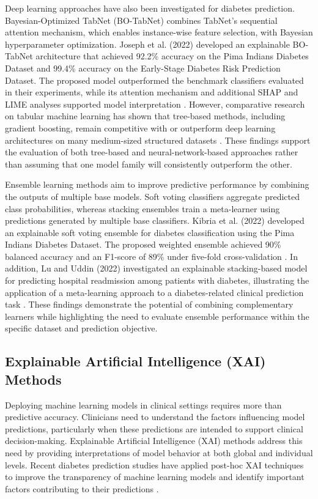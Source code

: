 Deep learning approaches have also been investigated for diabetes prediction. Bayesian-Optimized TabNet (BO-TabNet) combines TabNet's sequential attention mechanism, which enables instance-wise feature selection, with Bayesian hyperparameter optimization. Joseph et al. (2022) developed an explainable BO-TabNet architecture that achieved 92.2\% accuracy on the Pima Indians Diabetes Dataset and 99.4\% accuracy on the Early-Stage Diabetes Risk Prediction Dataset. The proposed model outperformed the benchmark classifiers evaluated in their experiments, while its attention mechanism and additional SHAP and LIME analyses supported model interpretation \cite{joseph_tabnet_diabetes_2022}. However, comparative research on tabular machine learning has shown that tree-based methods, including gradient boosting, remain competitive with or outperform deep learning architectures on many medium-sized structured datasets \cite{grinsztajn_tabular_2022}. These findings support the evaluation of both tree-based and neural-network-based approaches rather than assuming that one model family will consistently outperform the other.

Ensemble learning methods aim to improve predictive performance by combining the outputs of multiple base models. Soft voting classifiers aggregate predicted class probabilities, whereas stacking ensembles train a meta-learner using predictions generated by multiple base classifiers. Kibria et al. (2022) developed an explainable soft voting ensemble for diabetes classification using the Pima Indians Diabetes Dataset. The proposed weighted ensemble achieved 90\% balanced accuracy and an F1-score of 89\% under five-fold cross-validation \cite{kibria_soft_voting_2022}. In addition, Lu and Uddin (2022) investigated an explainable stacking-based model for predicting hospital readmission among patients with diabetes, illustrating the application of a meta-learning approach to a diabetes-related clinical prediction task \cite{lu_uddin_stacking_2022}. These findings demonstrate the potential of combining complementary learners while highlighting the need to evaluate ensemble performance within the specific dataset and prediction objective.

\subsection{Explainable Artificial Intelligence (XAI) Methods}

Deploying machine learning models in clinical settings requires more than predictive accuracy. Clinicians need to understand the factors influencing model predictions, particularly when these predictions are intended to support clinical decision-making. Explainable Artificial Intelligence (XAI) methods address this need by providing interpretations of model behavior at both global and individual levels. Recent diabetes prediction studies have applied post-hoc XAI techniques to improve the transparency of machine learning models and identify important factors contributing to their predictions \cite{kirbas_cifci_shap_2025, hasan_automl_xai_2025}.

